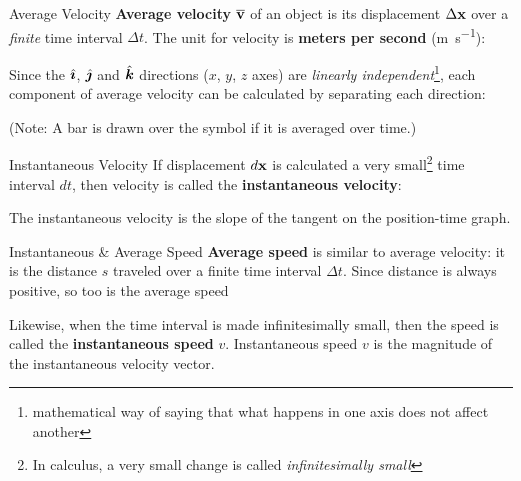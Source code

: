\documentclass[12pt,compress,aspectratio=169]{beamer}
\newcommand{\iii}{\ensuremath\hat{\bm{\imath}}}
\newcommand{\jjj}{\ensuremath\hat{\bm{\jmath}}}
\newcommand{\kkk}{\ensuremath\hat{\bm{k}}}
\newcommand{\mb}[1]{\ensuremath\mathbf{#1}}
\newcommand{\eq}[2]{\vspace{#1}{\Large\begin{displaymath}#2\end{displaymath}}}
\begin{document}
\begin{frame}{Average Velocity}
  \textbf{Average velocity} $\overline{\mb{v}}$ of an object is its
  displacement $\Delta\mb{x}$ over a \emph{finite} time interval $\Delta t$.
  The unit for velocity is \textbf{meters per second} (\si{\metre\per\second}):

  \eq{-.2in}{
    \boxed{
      \overline{\mb{v}}= \frac{\Delta\mb{x}}{\Delta t}
    }
  }
  
  Since the $\iii$, $\jjj$ and $\kkk$ directions ($x$, $y$, $z$ axes) are
  \emph{linearly independent}\footnote{mathematical way of saying that what happens in
  one axis does not affect another}, each component of average velocity can be
  calculated by separating each direction:

  \eq{-.2in}{
    \boxed{
      \overline{\mb{v}}=
      \frac{\Delta x}{\Delta t}\iii + \frac{\Delta y}{\Delta t}\jjj +
      \frac{\Delta z}{\Delta t}\kkk
    }
  }

  (Note: A bar is drawn over the symbol if it is averaged over time.)
  \vspace{.15in}
\end{frame}



\begin{frame}{Instantaneous Velocity}
  If displacement $d\mb{x}$ is calculated a very small\footnote{In
    calculus, a very small change is called \emph{infinitesimally small}} time
  interval $dt$, then velocity is called the \textbf{instantaneous velocity}:
  
  \eq{-.2in}{
	\overline{\mb{v}}= \frac{\Delta\mb{x}}{\Delta t}\quad\rightarrow\quad
	\boxed{\mb{v}= \frac{d\mb{x}}{dt}}
  }
  
  The instantaneous velocity is the slope of the tangent on the position-time graph.
\end{frame}



\begin{frame}{Instantaneous \& Average Speed}
  \textbf{Average speed} is similar to average velocity: it is the distance $s$
  traveled over a finite time interval $\Delta t$. Since distance is always
  positive, so too is the average speed
 
  \eq{-.2in}{
    \boxed{\overline{v}=\frac{s}{\Delta t}}
  }

  Likewise, when the time interval is made infinitesimally small, then the speed is
  called the \textbf{instantaneous speed} $v$. Instantaneous speed $v$ is the
  magnitude of the instantaneous velocity vector.
\end{frame}
\end{document}
